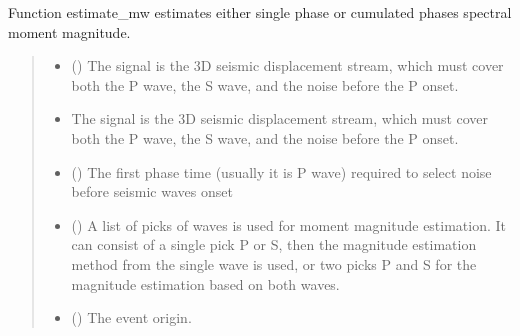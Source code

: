 \documentclass[letterpaper,10pt,english]{sphinxmanual}
\begin{document}
\begin{fulllineitems}
\label{\detokenize{api_support:amw.mw.estimation.estimate_mw}}
\pysigstartsignatures
{}
\pysigstopsignatures
\sphinxAtStartPar
Function estimate\_mw estimates either single phase or cumulated phases spectral moment magnitude.
\begin{quote}\begin{description}
\begin{itemize}
\item {} 
\sphinxAtStartPar
{} () \textendash{} The signal is the 3D seismic displacement stream, which must cover both the P wave, the S wave,
and the noise before the P onset.

\item {} 
\sphinxAtStartPar
{} \textendash{} The signal is the 3D seismic displacement stream, which must cover both the P wave, the S wave,
and the noise before the P onset.

\item {} 
\sphinxAtStartPar
{} () \textendash{} The first phase time (usually it is P wave) required to select noise before seismic waves onset

\item {} 
\sphinxAtStartPar
{} (\sphinxstyleliteralemphasis{\sphinxupquote{(}}\sphinxstyleliteralemphasis{\sphinxupquote{)}}) \textendash{} A list of picks of waves is used for moment magnitude estimation.
It can consist of a single pick P or S, then the magnitude estimation method from the single wave is used,
or two picks P and S for the magnitude estimation based on both waves.

\item {} 
\sphinxAtStartPar
{} () \textendash{} The event origin.


\end{itemize}
\end{description}
\end{quote}
\end{fulllineitems}
\end{document}

